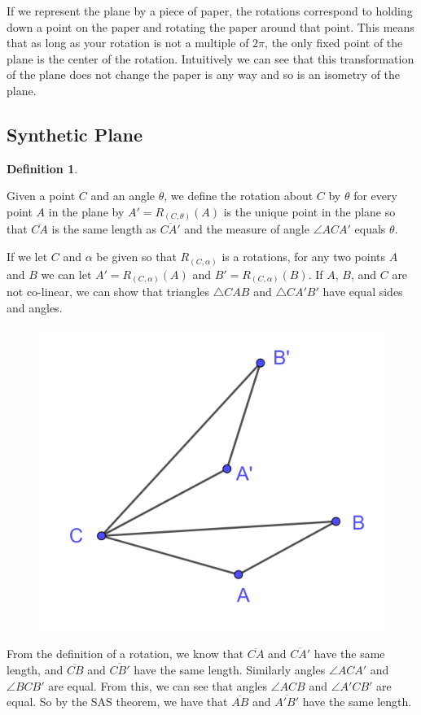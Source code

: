 \documentclass[
]{book}
\theoremstyle{definition}
\newtheorem{definition}{Definition}[chapter]
\theoremstyle{definition}
\theoremstyle{definition}
\theoremstyle{definition}
\theoremstyle{remark}
\begin{document}
If we represent the plane by a piece of paper, the rotations correspond to holding down a point on the paper and rotating the paper around that point. This means that as long as your rotation is not a multiple of \(2\pi\), the only fixed point of the plane is the center of the rotation. Intuitively we can see that this transformation of the plane does not change the paper is any way and so is an isometry of the plane.

\hypertarget{synthetic-plane-2}{%
\subsection{Synthetic Plane}\label{synthetic-plane-2}}

\begin{definition}
\protect\hypertarget{def:unlabeled-div-266}{}\label{def:unlabeled-div-266}

Given a point \(C\) and an angle \(\theta\), we define the rotation about \(C\) by \(\theta\) for every point \(A\) in the plane by \(A'=R_{(C,\theta)}(A)\) is the unique point in the plane so that \(\overline{CA}\) is the same length as \(\overline{CA'}\) and the measure of angle \(\angle ACA'\) equals \(\theta\).

\end{definition}

If we let \(C\) and \(\alpha\) be given so that \(R_{(C,\alpha)}\) is a rotations, for any two points \(A\) and \(B\) we can let \(A'=R_{(C,\alpha)}(A)\) and \(B'=R_{(C,\alpha)}(B)\). If \(A\), \(B\), and \(C\) are not co-linear, we can show that triangles \(\triangle CAB\) and \(\triangle CA'B'\) have equal sides and angles.

\begin{figure}

{\centering \includegraphics[width=0.3\linewidth]{images/Rotation_synthetic} 

}

\end{figure}

From the definition of a rotation, we know that \(\overline{CA}\) and \(\overline{CA'}\) have the same length, and \(\overline{CB}\) and \(\overline{CB'}\) have the same length. Similarly angles \(\angle ACA'\) and \(\angle BCB'\) are equal. From this, we can see that angles \(\angle ACB\) and \(\angle A'CB'\) are equal. So by the SAS theorem, we have that \(\overline{AB}\) and \(\overline{A'B'}\) have the same length.
\end{document}
